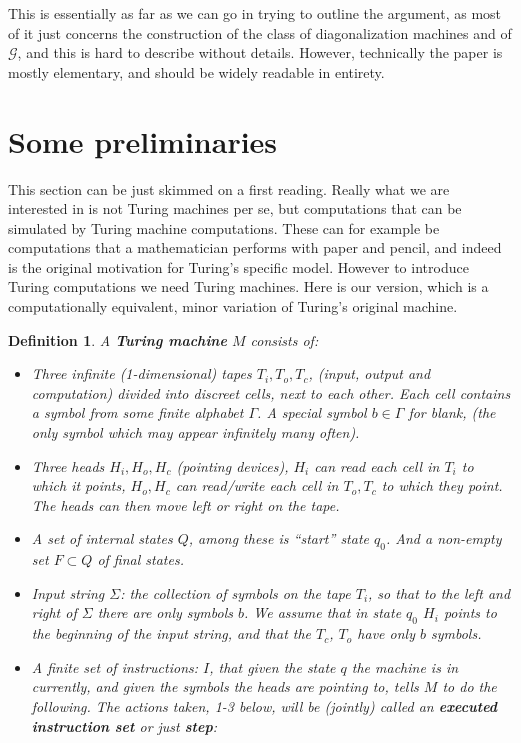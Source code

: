 \documentclass{amsart}  %
\numberwithin{equation}{section}
\newtheorem{definition}[equation]{Definition}
\theoremstyle{definition}
\theoremstyle{remark}
\begin{document}
{This is essentially as far as we can go in trying to outline the argument, as most of it just concerns the construction of the class of diagonalization machines and of $\mathcal{G}$, and this is hard to describe without details. However, technically the paper is mostly elementary, and should be widely readable in entirety. 
\section {Some preliminaries} \label{sec:prelims}
This section can be just skimmed on a first reading.
Really what we are interested in is not Turing machines per se, but computations that can be simulated by Turing machine computations. These can for example be computations that a mathematician performs with paper and pencil, and indeed is the original motivation for Turing's specific model. However to introduce Turing computations we need Turing machines. Here is our version, which is a computationally equivalent, minor variation of Turing's original machine.
\begin{definition} \label{def:Machine} A \textbf{\emph{Turing machine}} $M$ consists of:
  \begin{itemize} 
     \item Three infinite (1-dimensional) tapes $T _{i}, T _{o}, T _{c}   $, (input, output and computation) divided into discreet cells, next to each other. Each cell contains a symbol from some finite alphabet $\Gamma$. A special symbol $b \in \Gamma$ for blank, (the only symbol which may appear infinitely many often).
     \item Three  heads $H _{i}, H _{o}, H _{c}   $ (pointing devices),  $H _{i} $ can read each cell in $T _{i} $ to which it points, $H _{o}, H _{c}  $ can read/write each cell in $T _{o}, T _{c}  $ to which they point.
        The heads can then move left or right on the tape.
     \item A set of internal states $Q$, among these is ``start'' state $q _{0} $. And a non-empty set $F \subset Q$ of final states.
\item Input string $\Sigma$: the collection of symbols on the tape $T _{i} $, so that to the left and right of $\Sigma$ there are only symbols $b$. We assume that in state $q _{0} $ $H _{i} $ points to the beginning of the input string, and that the $T _{c} $, $T _{o} $ have only $b$ symbols.
\item A finite set of instructions: $I$, that given the state $q$ the machine is in currently, and given the symbols the heads are pointing to, tells $M$ to do the following. The actions taken, 1-3 below, will be (jointly) called an \textbf{\emph{executed instruction set}} or just \textbf{\emph{step}}:

\end{itemize}
\end{definition}}
\end{document}

